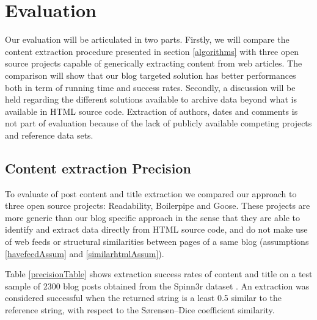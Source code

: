 \section{Evaluation}

Our evaluation will be articulated in two parts. Firstly, we will compare the content extraction procedure presented in section \ref{algorithms} with three open source projects capable of generically extracting content from web articles. The comparison will show that our blog targeted solution has better performances both in term of running time and success rates. Secondly, a discussion will be held regarding the different solutions available to archive data beyond what is available in HTML source code. Extraction of authors, dates and comments is not part of evaluation because of the lack of publicly available competing projects and reference data sets.


\subsection{Content extraction Precision}
To evaluate of post content and title extraction we compared our approach to three open source projects: Readability\cite{}, Boilerpipe\cite{kohlschuetter2010} and Goose\cite{}. These projects are more generic than our blog specific approach in the sense that they are able to identify and extract data directly from HTML source code, and do not make use of web feeds or structural similarities between pages of a same blog (assumptions \ref{havefeedAssum} and \ref{similarhtmlAssum}).


Table \ref{precisionTable} shows extraction success rates of content and title on a test sample of 2300 blog posts obtained from the Spinn3r dataset \cite{burton2011}. An extraction was considered successful when the returned string is a least 0.5 similar to the reference string, with respect to the Sørensen–Dice coefficient similarity.

\precisionTable

